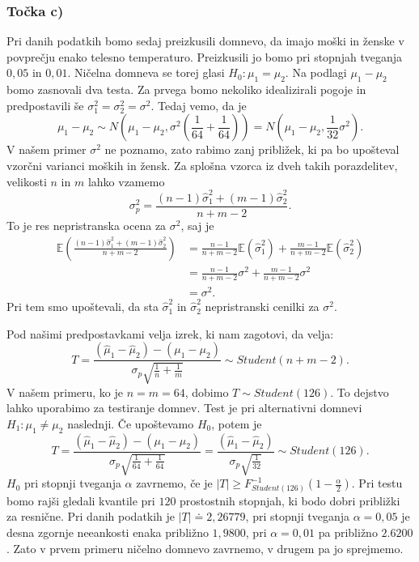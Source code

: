 \documentclass[12pt, letterpaper]{article}
\begin{document}
\subsubsection*{Točka c)} Pri danih podatkih bomo sedaj preizkusili domnevo, da imajo moški in ženske v povprečju enako telesno temperaturo. Preizkusili jo bomo pri stopnjah tveganja $0,05$ in $0,01$. Ničelna domneva se torej glasi $H_0: \mu_1 = \mu_2$. Na podlagi $\mu_1 - \mu_2$ bomo zasnovali dva testa. Za prvega bomo nekoliko idealizirali pogoje in predpostavili še $\sigma_1^2 = \sigma_2^2 = \sigma^2$. Tedaj vemo, da je
\[
\mu_1 - \mu_2 \sim N\left(\mu_1 - \mu_2, \sigma^2\left(\frac{1}{64} + \frac{1}{64}\right)\right) = N\left(\mu_1 - \mu_2, \frac{1}{32}\sigma^2\right).
\]
V našem primer $\sigma^2$ ne poznamo, zato rabimo zanj približek, ki pa bo upošteval vzorčni varianci moških in žensk. Za splošna vzorca iz dveh takih porazdelitev, velikosti $n$ in $m$ lahko vzamemo
\[
\sigma_p^2 = \frac{(n-1)\hat{\sigma}_1^2 + (m-1)\hat{\sigma}_2^2}{n+m-2}.
\]
To je res nepristranska ocena za $\sigma^2$, saj je
\begin{align*}
\mathbb{E}\left(\frac{(n-1)\hat{\sigma}_1^2 + (m-1)\hat{\sigma}_2^2}{n+m-2}\right) &= \frac{n-1}{n+m-2}\mathbb{E}(\hat{\sigma}_1^2) + \frac{m-1}{n+m-2}\mathbb{E}(\hat{\sigma}_2^2) \\
&= \frac{n-1}{n+m-2}\sigma^2 + \frac{m-1}{n+m-2}\sigma^2 \\
&= \sigma^2.
\end{align*}
Pri tem smo upoštevali, da sta $\hat{\sigma}_1^2$ in $\hat{\sigma}_2^2$ nepristranski cenilki za $\sigma^2$.

Pod našimi predpostavkami velja izrek, ki nam zagotovi, da velja:
\[
T = \frac{(\hat{\mu}_1 - \hat{\mu}_2) - (\mu_1 - \mu_2)}{\sigma_p\sqrt{\frac{1}{n} + \frac{1}{m}}} \sim Student(n+m-2).
\]
V našem primeru, ko je $n=m=64$, dobimo $T \sim Student(126)$. To dejstvo lahko uporabimo za testiranje domnev. Test je pri alternativni domnevi $H_1 : \mu_1 \neq \mu_2$ naslednji. 
Če upoštevamo $H_0$, potem je
\[
T = \frac{(\hat{\mu}_1 - \hat{\mu}_2) - (\mu_1 - \mu_2)}{\sigma_p\sqrt{\frac{1}{64} + \frac{1}{64}}} = \frac{(\hat{\mu}_1 - \hat{\mu}_2)}{\sigma_p\sqrt{\frac{1}{32}}} \sim Student(126).
\]
$H_0$ pri stopnji tveganja $\alpha$ zavrnemo, če je $|T| \geq F^{-1}_{Student(126)}(1 - \frac{\alpha}{2})$. Pri testu bomo rajši gledali kvantile pri $120$ prostostnih stopnjah, ki bodo dobri približki za resnične. Pri danih podatkih je $|T| \doteq 2,26779$, pri stopnji tveganja $\alpha = 0,05$ je desna zgornje neeankosti enaka približno $1,9800$, pri $\alpha = 0,01$ pa približno $2.6200$. Zato v prvem primeru ničelno domnevo zavrnemo, v drugem pa jo sprejmemo.
\end{document}
